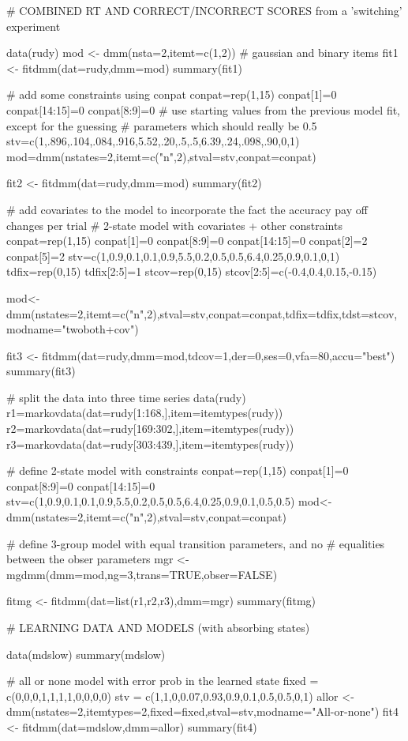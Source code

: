 \documentclass[a4paper]{book}
\begin{document}
\begin{Examples}
\begin{ExampleCode}

# COMBINED RT AND CORRECT/INCORRECT SCORES from a 'switching' experiment

data(rudy)
mod <- dmm(nsta=2,itemt=c(1,2)) # gaussian and binary items
fit1 <- fitdmm(dat=rudy,dmm=mod)
summary(fit1)

# add some constraints using conpat
conpat=rep(1,15)
conpat[1]=0
conpat[14:15]=0
conpat[8:9]=0
# use starting values from the previous model fit, except for the guessing 
# parameters which should really be 0.5
stv=c(1,.896,.104,.084,.916,5.52,.20,.5,.5,6.39,.24,.098,.90,0,1)
mod=dmm(nstates=2,itemt=c("n",2),stval=stv,conpat=conpat)

fit2 <- fitdmm(dat=rudy,dmm=mod)
summary(fit2)

# add covariates to the model to incorporate the fact the accuracy pay off changes per trial
# 2-state model with covariates + other constraints
conpat=rep(1,15)
conpat[1]=0
conpat[8:9]=0
conpat[14:15]=0
conpat[2]=2
conpat[5]=2
stv=c(1,0.9,0.1,0.1,0.9,5.5,0.2,0.5,0.5,6.4,0.25,0.9,0.1,0,1)
tdfix=rep(0,15)
tdfix[2:5]=1
stcov=rep(0,15)
stcov[2:5]=c(-0.4,0.4,0.15,-0.15)

mod<-dmm(nstates=2,itemt=c("n",2),stval=stv,conpat=conpat,tdfix=tdfix,tdst=stcov,modname="twoboth+cov")

fit3 <- fitdmm(dat=rudy,dmm=mod,tdcov=1,der=0,ses=0,vfa=80,accu="best")
summary(fit3)

# split the data into three time series
data(rudy)
r1=markovdata(dat=rudy[1:168,],item=itemtypes(rudy))
r2=markovdata(dat=rudy[169:302,],item=itemtypes(rudy))
r3=markovdata(dat=rudy[303:439,],item=itemtypes(rudy))

# define 2-state model with constraints
conpat=rep(1,15)
conpat[1]=0
conpat[8:9]=0
conpat[14:15]=0
stv=c(1,0.9,0.1,0.1,0.9,5.5,0.2,0.5,0.5,6.4,0.25,0.9,0.1,0.5,0.5)
mod<-dmm(nstates=2,itemt=c("n",2),stval=stv,conpat=conpat)

# define 3-group model with equal transition parameters, and no 
# equalities between the obser parameters
mgr <-mgdmm(dmm=mod,ng=3,trans=TRUE,obser=FALSE)

fitmg <- fitdmm(dat=list(r1,r2,r3),dmm=mgr)
summary(fitmg)

# LEARNING DATA AND MODELS (with absorbing states)

data(mdslow)
summary(mdslow)

# all or none model with error prob in the learned state
fixed = c(0,0,0,1,1,1,1,0,0,0,0)
stv = c(1,1,0,0.07,0.93,0.9,0.1,0.5,0.5,0,1)
allor <- dmm(nstates=2,itemtypes=2,fixed=fixed,stval=stv,modname="All-or-none")
fit4 <- fitdmm(dat=mdslow,dmm=allor)
summary(fit4)


\end{ExampleCode}
\end{Examples}
\end{document}
